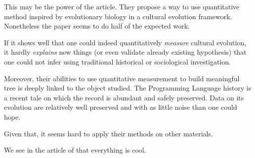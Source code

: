 \documentclass[a4paper]{article}
\begin{document}
This may be the power of the article. They propose a way to use quantitative method inspired by evolutionary biology in a cultural evolution framework. Nonetheless the paper seems to do half of the expected work. 

If it shows well that one could  indeed quantitatively \emph{measure} cultural evolution, it hardly \emph{explains} new things (or even validate already existing hypothesis) that one could not infer using traditional historical or sociological investigation. 

Moreover, their abilities to use quantitative measurement to build meaningful tree is deeply linked to the object studied. The Programming Language history is a recent tale on which the record is abundant and safely preserved. Data on its evolution are relatively well preserved and with as little noise than one could hope.

Given that, it seems hard to apply their methods on other materials. 



We see in the article of \cite{mesoudi2009randomcopyingfrequencydependencopyingandulturechange} that everything is cool.



  
\end{document}
